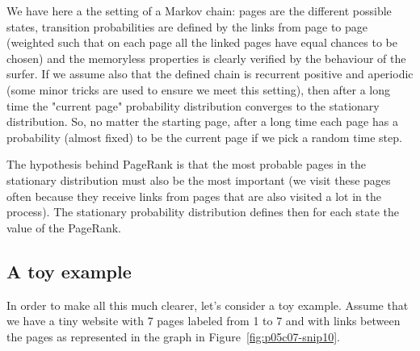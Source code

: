 We have here a the setting of a Markov chain: pages are the different possible states, transition probabilities are defined by the links from page to page (weighted such that on each page all the linked pages have equal chances to be chosen) and the memoryless properties is clearly verified by the behaviour of the surfer. If we assume also that the defined chain is recurrent positive and aperiodic (some minor tricks are used to ensure we meet this setting), then after a long time the "current page" probability distribution converges to the stationary distribution. So, no matter the starting page, after a long time each page has a probability (almost fixed) to be the current page if we pick a random time step.

The hypothesis behind PageRank is that the most probable pages in the stationary distribution must also be the most important (we visit these pages often because they receive links from pages that are also visited a lot in the process). The stationary probability distribution defines then for each state the value of the PageRank.

\subsection{A toy example}

In order to make all this much clearer, let's consider a toy example. Assume that we have a tiny website with 7 pages labeled from 1 to 7 and with links between the pages as represented in the graph in Figure~\ref{fig:p05c07-snip10}.


